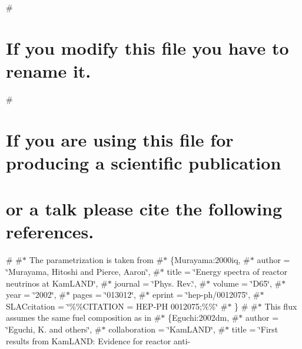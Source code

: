 \# \section*{If you modify this file you have to rename it.}

\# \section*{If you are using this file for producing a scientific publication}

\section*{or a talk please cite the following references.}

\# \#$\ast$ The parametrization is taken from \#$\ast$ \{Murayama\+:2000iq, \#$\ast$ author = \char`\"{}\+Murayama, Hitoshi and Pierce, Aaron\char`\"{}, \#$\ast$ title = \char`\"{}\+Energy spectra of reactor neutrinos at Kam\+L\+A\+N\+D\char`\"{}, \#$\ast$ journal = \char`\"{}\+Phys. Rev.\char`\"{}, \#$\ast$ volume = \char`\"{}\+D65\char`\"{}, \#$\ast$ year = \char`\"{}2002\char`\"{}, \#$\ast$ pages = \char`\"{}013012\char`\"{}, \#$\ast$ eprint = \char`\"{}hep-\/ph/0012075\char`\"{}, \#$\ast$ S\+L\+A\+Ccitation = \char`\"{}\%\%\+C\+I\+T\+A\+T\+I\+O\+N = H\+E\+P-\/\+P\+H 0012075;\%\%\char`\"{} \#$\ast$ \} \# \#$\ast$ This flux assumes the same fuel composition as in \#$\ast$ \{Eguchi\+:2002dm, \#$\ast$ author = \char`\"{}\+Eguchi, K. and others\char`\"{}, \#$\ast$ collaboration = \char`\"{}\+Kam\+L\+A\+N\+D\char`\"{}, \#$\ast$ title = \char`\"{}\+First results from Kam\+L\+A\+N\+D\+: Evidence for reactor anti-\/
